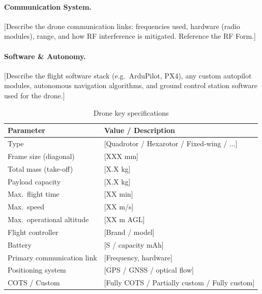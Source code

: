 \paragraph{Communication System.}
[Describe the drone communication links: frequencies used, hardware (radio
modules), range, and how RF interference is mitigated. Reference the RF Form.]

\paragraph{Software \& Autonomy.}
[Describe the flight software stack (e.g.\ ArduPilot, PX4), any custom
autopilot modules, autonomous navigation algorithms, and ground control station
software used for the drone.]

\begin{table}[H]
    \centering
    \caption{Drone key specifications}
    \label{tab:drone_specs}
    \begin{tabular}{L{5cm} L{7cm}}
        \toprule
        \textbf{Parameter}            & \textbf{Value / Description} \\
        \midrule
        Type                          & [Quadrotor / Hexarotor / Fixed-wing / ...] \\
        Frame size (diagonal)         & [XXX mm] \\
        Total mass (take-off)         & [X.X kg] \\
        Payload capacity              & [X.X kg] \\
        Max.\ flight time             & [XX min] \\
        Max.\ speed                   & [XX m/s] \\
        Max.\ operational altitude    & [XX m AGL] \\
        Flight controller             & [Brand / model] \\
        Battery                       & [S / capacity mAh] \\
        Primary communication link    & [Frequency, hardware] \\
        Positioning system            & [GPS / GNSS / optical flow] \\
        COTS / Custom                 & [Fully COTS / Partially custom / Fully custom] \\
        \bottomrule
    \end{tabular}
\end{table}
